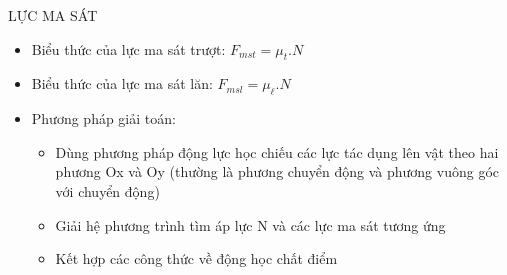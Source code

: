 \begin{dang}{LỰC MA SÁT}
\begin{itemize}
\item Biểu thức của lực ma sát trượt: $F_{mst}=\mu_t .N$
\item Biểu thức của lực ma sát lăn: $F_{msl}=\mu_\ell .N$
\item Phương pháp giải toán:
\begin{itemize}
\item Dùng phương pháp động lực học chiếu các lực tác dụng lên vật theo hai phương Ox và Oy (thường là phương chuyển động và phương vuông góc với chuyển động)
\item Giải hệ phương trình tìm áp lực N và các lực ma sát tương ứng
\item Kết hợp các công thức về động học chất điểm
\end{itemize}
\end{itemize}
\end{dang}
